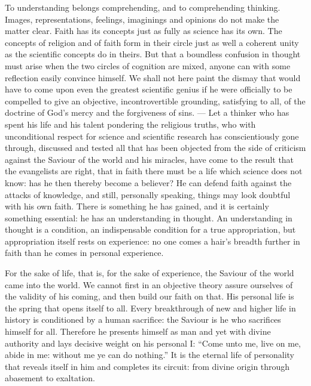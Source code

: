 \documentclass[12pt,a4paper,openany]{book}
\newcommand{\opage}[1]{\marginnote{\footnotesize\textit{[#1]}}}
\begin{document}
To understanding belongs comprehending, and to comprehending thinking. Images, representations,
feelings, imaginings and opinions do not make the matter clear. Faith has its concepts just as fully as
science has its own. The concepts of religion and of faith form in their circle just as well a coherent
unity as the scientific concepts do in theirs. But that a boundless confusion in thought must arise
when the two circles of cognition are mixed, anyone can with some
\setcounter{footnote}{0}%
\opage{81}reflection easily convince himself. We shall not here paint the dismay that would have to come
upon even the greatest scientific genius if he were officially to be compelled to give an objective,
incontrovertible grounding, satisfying to all, of the doctrine of God's mercy and the forgiveness of
sins. --- Let a thinker who has spent his life and his talent pondering the religious truths, who with
unconditional respect for science and scientific research has conscientiously gone through, discussed
and tested all that has been objected from the side of criticism against the Saviour of the world and
his miracles, have come to the result that the evangelists are right, that in faith there must be a
life which science does not know: has he then thereby become a believer? He can defend faith against
the attacks of knowledge, and still, personally speaking, things may look doubtful with his own faith.
There is something he has gained, and it is certainly something essential: he has an understanding in
thought. An understanding in thought is a condition, an indispensable condition for a true
appropriation, but appropriation itself rests on experience: no one comes a hair's breadth further in
faith than he comes in personal experience.

For the sake of life, that is, for the sake of experience, the Saviour of the world came into the
world. We cannot first in an objective theory assure ourselves of the validity of his coming, and then
build our faith on that. His personal life is the spring that opens itself to all. Every breakthrough of
new and higher life in history is conditioned by a human sacrifice: the Saviour is he who sacrifices
himself for all. Therefore he presents himself as man and yet with divine authority and lays decisive
weight on his
\setcounter{footnote}{0}%
\opage{82}personal I: ``Come unto me, live on me, abide in me: without me ye can do nothing.'' It is the
eternal life of personality that reveals itself in him and completes its circuit: from divine origin
through abasement to exaltation.
\end{document}
